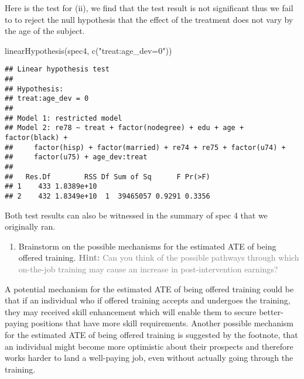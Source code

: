 \documentclass[
]{article}
\newenvironment{Shaded}{\begin{snugshade}}{\end{snugshade}}
\newcommand{\FunctionTok}[1]{\textcolor[rgb]{0.00,0.00,0.00}{#1}}
\newcommand{\NormalTok}[1]{#1}
\newcommand{\StringTok}[1]{\textcolor[rgb]{0.31,0.60,0.02}{#1}}
\providecommand{\tightlist}{%
  \setlength{\itemsep}{0pt}\setlength{\parskip}{0pt}}
\begin{document}
Here is the test for (ii), we find that the test result is not
significant thus we fail to to reject the null hypothesis that the
effect of the treatment does not vary by the age of the subject.

\begin{Shaded}
\begin{Highlighting}[]
\FunctionTok{linearHypothesis}\NormalTok{(spec4, }\FunctionTok{c}\NormalTok{(}\StringTok{"treat:age\_dev=0"}\NormalTok{))}
\end{Highlighting}
\end{Shaded}

\begin{verbatim}
## Linear hypothesis test
## 
## Hypothesis:
## treat:age_dev = 0
## 
## Model 1: restricted model
## Model 2: re78 ~ treat + factor(nodegree) + edu + age + factor(black) + 
##     factor(hisp) + factor(married) + re74 + re75 + factor(u74) + 
##     factor(u75) + age_dev:treat
## 
##   Res.Df        RSS Df Sum of Sq      F Pr(>F)
## 1    433 1.8389e+10                           
## 2    432 1.8349e+10  1  39465057 0.9291 0.3356
\end{verbatim}

Both test results can also be witnessed in the summary of spec 4 that we
originally ran.

\begin{enumerate}
\def\labelenumi{\arabic{enumi}.}
\setcounter{enumi}{2}
\tightlist
\item
  Brainstorm on the possible mechanisms for the estimated ATE of being
  offered training.
  \textcolor{gray}{\textbf{Hint:} Can you think of the possible pathways through which on-the-job training may cause an increase in post-intervention earnings?}\label{item:oot:ate-vs-ite}
\end{enumerate}

A potential mechanism for the estimated ATE of being offered training
could be that if an individual who if offered training accepts and
undergoes the training, they may received skill enhancement which will
enable them to secure better-paying positions that have more skill
requirements. Another possible mechanism for the estimated ATE of being
offered training is suggested by the footnote, that an individual might
become more optimistic about their prospects and therefore works harder
to land a well-paying job, even without actually going through the
training.
\end{document}
